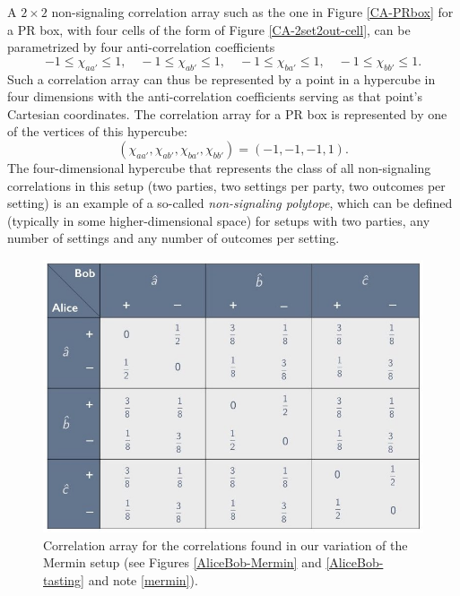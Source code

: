 A $2 \times 2$ non-signaling correlation array such as the one in Figure \ref{CA-PRbox} for a PR box, with four cells of the form of Figure \ref{CA-2set2out-cell}, can be parametrized by four anti-correlation coefficients
\begin{equation}
-1 \le \chi_{aa'} \le 1, \quad -1 \le \chi_{ab'} \le 1, \quad -1 \le \chi_{ba'} \le 1, \quad -1 \le \chi_{bb'} \le 1.
\label{chi values for PR box}
\end{equation}
Such a correlation array can thus be represented by a point in a hypercube in four dimensions with the anti-correlation coefficients serving as that point's Cartesian coordinates. The correlation array for a PR box is represented by one of the vertices of this hypercube: 
\begin{equation}
(\chi_{aa'}, \chi_{ab'}, \chi_{ba'}, \chi_{bb'}) = (-1, -1, -1, 1).
\label{PR box vertices}
\end{equation}
The four-dimensional hypercube that represents the class of all non-signaling correlations in this setup (two parties, two settings per party, two outcomes per setting) is an example of a so-called \emph{non-signaling polytope}, which can be defined (typically in some higher-dimensional space) for setups with two parties, any number of settings and any number of outcomes per setting. 

\begin{figure}[ht]
 \centering
   \includegraphics[width=4.5in]{CA-3set2out-Mermin.jpeg} 
   \caption{Correlation array for the correlations found in our variation of the Mermin setup (see Figures \ref{AliceBob-Mermin} and \ref{AliceBob-tasting} and note \ref{mermin}).}
   \label{CA-3set2out-Mermin}
\end{figure}

